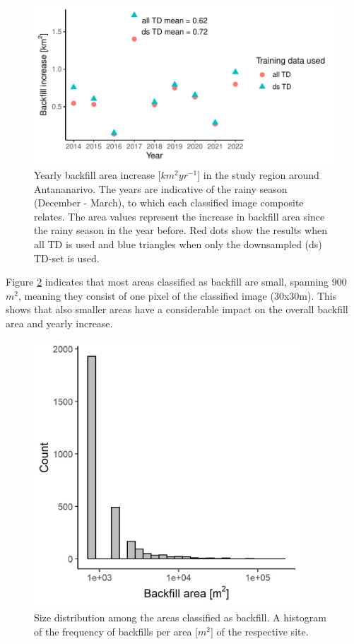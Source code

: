 \documentclass[11pt, letterpaper, oneside]{article}
\begin{document}
\begin{figure}[H]
\includegraphics[width = 15cm]{figures/Backfill area increase km 2.pdf}
\caption{Yearly backfill area increase [$km^2yr^{-1} $] in the study region around Antananarivo. The years are indicative of the rainy season (December - March), to which each classified image composite relates. The area values represent the increase in backfill area since the rainy season in the year before. Red dots show the results when all TD is used and blue triangles when only the downsampled (ds) TD-set is used.}
\label{fig:areakm2}
\end{figure}

Figure \ref{fig:BFtypo} indicates that most areas classified as backfill are small, spanning 900 $m^2$, meaning they consist of one pixel of the classified image (30x30m). This shows that also smaller areas have a considerable impact on the overall backfill area and yearly increase.

\begin{figure}[H]
\includegraphics[width = 10cm]{figures/Backfill typology sizes.jpeg}
\caption{Size distribution among the areas classified as backfill. A histogram of the frequency of backfills per area [$m^2$] of the respective site.}
\label{fig:BFtypo}
\end{figure}
\end{document}
